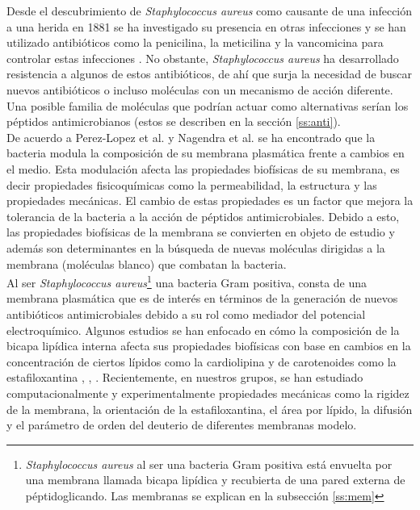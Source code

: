 \documentclass[12pt]{article}
\begin{document}
Desde el descubrimiento de \textit{Staphylococcus aureus} como causante de una infecci\'on a una herida en 1881 \cite{Orent2006AMagazine} se ha investigado su presencia en otras infecciones y se han utilizado antibi\'oticos como la penicilina, la meticilina y la vancomicina para controlar estas infecciones   \cite{HarpavatS.NissimS.LipppincottsMicrocards:MicrobiologyFlashCards2012.}. No obstante, \textit{Staphylococcus aureus} ha desarrollado resistencia a algunos de estos antibi\'oticos,  de ahí que surja la necesidad de buscar nuevos antibi\'oticos o incluso moléculas con un mecanismo de acción diferente. Una posible familia de moléculas que podrían actuar como alternativas serían los péptidos antimicrobianos (estos se describen en la sección \ref{ss:anti}).\\

De acuerdo a Perez-Lopez et al. \cite{Perez-LopezVariationsProperties} y Nagendra et al.  \cite{Nagendra2011} se ha encontrado que la bacteria modula la composición de su membrana plasmática frente a cambios en el medio. Esta modulación afecta las propiedades biofísicas de su membrana, es decir propiedades fisicoquímicas como la permeabilidad, la estructura y las propiedades mecánicas. El cambio de estas propiedades es un factor que mejora la tolerancia de la bacteria a la acción de péptidos antimicrobiales. Debido a esto, las propiedades biofísicas de la membrana se convierten en objeto de estudio y además son determinantes en la búsqueda de nuevas moléculas dirigidas a la membrana (moléculas blanco) que combatan la bacteria. \\

Al ser \textit{Staphylococcus aureus}\footnote{\textit{Staphylococcus aureus} al ser una bacteria Gram positiva está envuelta por una  membrana llamada bicapa lipídica y recubierta de una pared externa de péptidoglicando. Las membranas se explican en la subsección \ref{ss:mem}} una bacteria Gram positiva, consta de una membrana plasmática que es de interés en términos de la generación de nuevos antibióticos antimicrobiales debido a su rol como mediador del potencial electroquímico. Algunos estudios se han enfocado en cómo la composición de la bicapa lipídica interna afecta sus propiedades biofísicas con base en cambios en la concentración de ciertos lípidos como la cardiolipina \cite{Hernandez-Villa1BiophysicalPeptides} y de carotenoides como la estafiloxantina \cite{MelendezDelgado2018StudyingBilayers}, \cite{Perez-LopezVariationsProperties}, \cite{Nagendra2011}. Recientemente, en nuestros grupos, se han estudiado computacionalmente y experimentalmente propiedades mecánicas como la rigidez de la membrana, la orientación de la estafiloxantina, el área por lípido, la difusión y el parámetro de orden del deuterio de diferentes membranas modelo.\\
\end{document}
